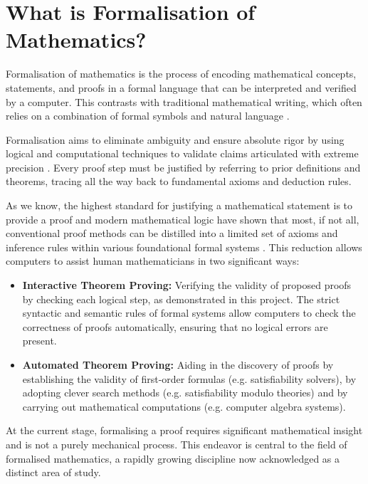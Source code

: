 \section{What is Formalisation of Mathematics?}

Formalisation of mathematics is the process of encoding mathematical concepts, statements, and proofs
in a formal language that can be interpreted and verified by a computer.
This contrasts with traditional mathematical writing, which often relies on a combination of formal
symbols and natural language \cite{Bourbaki2004} \cite{Avigad2023}.

Formalisation aims to eliminate ambiguity and ensure absolute rigor by using logical and computational
techniques to validate claims articulated with extreme precision \cite{Avigad2014} \cite{Avigad2018} \cite{Avigad2024}.
Every proof step must be justified by referring to prior definitions and theorems, tracing all the way
back to fundamental axioms and deduction rules.

As we know, the highest standard for justifying a mathematical statement is to provide a proof and modern
mathematical logic have shown that most, if not all, conventional
proof methods can be distilled into a limited set of axioms and inference rules within various
foundational formal systems \cite{Avigad2022}. This reduction allows computers to assist human mathematicians in two significant ways:

\begin{itemize}
    \item \textbf{Interactive Theorem Proving:} Verifying the validity of proposed proofs by checking each logical step,
    as demonstrated in this project. The strict syntactic and semantic rules of formal systems allow
    computers to check the correctness of proofs automatically, ensuring that no logical errors are present.
    \item \textbf{Automated Theorem Proving:} Aiding in the discovery of proofs by establishing the validity
    of first-order formulas (e.g. satisfiability solvers), by adopting clever search methods (e.g. satisfiability modulo theories)
    and by carrying out mathematical computations (e.g. computer algebra systems).
\end{itemize}

At the current stage, formalising a proof requires significant mathematical insight and is not a purely mechanical process.
This endeavor is central to the field of formalised mathematics, a rapidly growing discipline now acknowledged
as a distinct area of study.

